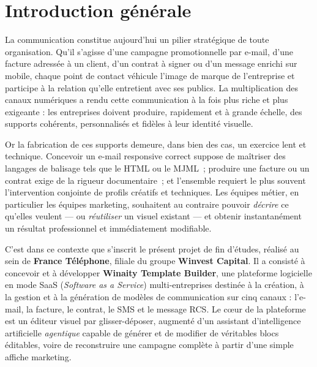 \chapter*{Introduction générale}

La communication constitue aujourd'hui un pilier stratégique de toute
organisation. Qu'il s'agisse d'une campagne promotionnelle par e-mail,
d'une facture adressée à un client, d'un contrat à signer ou d'un message
enrichi sur mobile, chaque point de contact véhicule l'image de marque de
l'entreprise et participe à la relation qu'elle entretient avec ses
publics. La multiplication des canaux numériques a rendu cette
communication à la fois plus riche et plus exigeante : les entreprises
doivent produire, rapidement et à grande échelle, des supports cohérents,
personnalisés et fidèles à leur identité visuelle.

Or la fabrication de ces supports demeure, dans bien des cas, un exercice
lent et technique. Concevoir un e-mail responsive correct suppose de
maîtriser des langages de balisage tels que le HTML ou le MJML~; produire
une facture ou un contrat exige de la rigueur documentaire~; et l'ensemble
requiert le plus souvent l'intervention conjointe de profils créatifs et
techniques. Les équipes métier, en particulier les équipes marketing,
souhaitent au contraire pouvoir \emph{décrire} ce qu'elles veulent — ou
\emph{réutiliser} un visuel existant — et obtenir instantanément un
résultat professionnel et immédiatement modifiable.

C'est dans ce contexte que s'inscrit le présent projet de fin d'études,
réalisé au sein de \textbf{France Téléphone}, filiale du groupe
\textbf{Winvest Capital}. Il a consisté à concevoir et à développer
\textbf{Winaity Template Builder}, une plateforme logicielle en mode SaaS
(\emph{Software as a Service}) multi-entreprises destinée à la création, à
la gestion et à la génération de modèles de communication sur cinq canaux :
l'e-mail, la facture, le contrat, le SMS et le message RCS. Le c\oe{}ur de
la plateforme est un éditeur visuel par glisser-déposer, augmenté d'un
assistant d'intelligence artificielle \emph{agentique} capable de générer
et de modifier de véritables blocs éditables, voire de reconstruire une
campagne complète à partir d'une simple affiche marketing.

